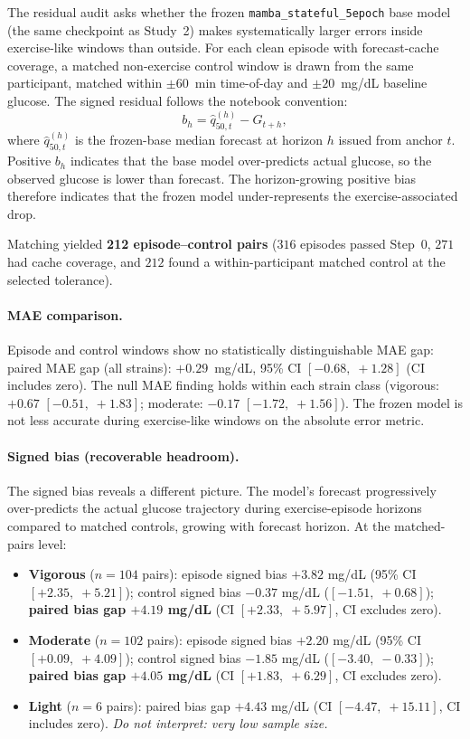 The residual audit asks whether the frozen \texttt{mamba\_stateful\_5epoch}
base model (the same checkpoint as Study~2) makes systematically larger errors
inside exercise-like windows than outside.
For each clean episode with forecast-cache coverage, a matched non-exercise
control window is drawn from the same participant, matched within
$\pm 60$~min time-of-day and $\pm 20$~mg/dL baseline glucose.
The signed residual follows the notebook convention:
\begin{equation}
  b_{h} = \hat{q}_{50,t}^{(h)} - G_{t+h},
  \label{eq:signed_residual}
\end{equation}
where $\hat{q}_{50,t}^{(h)}$ is the frozen-base median forecast at horizon $h$
issued from anchor $t$.
Positive $b_{h}$ indicates that the base model over-predicts actual glucose,
so the observed glucose is lower than forecast.  The horizon-growing positive
bias therefore indicates that the frozen model under-represents the
exercise-associated drop.

Matching yielded \textbf{212 episode--control pairs}
($316$ episodes passed Step~0, $271$ had cache coverage, and $212$ found a
within-participant matched control at the selected tolerance).

\paragraph{MAE comparison.}
Episode and control windows show no statistically distinguishable MAE gap:
paired MAE gap (all strains): $+0.29$~mg/dL, 95\% CI $[-0.68,\;+1.28]$
(CI includes zero).
The null MAE finding holds within each strain class
(vigorous: $+0.67$ $[-0.51,\;+1.83]$;
moderate: $-0.17$ $[-1.72,\;+1.56]$).
The frozen model is not less accurate during exercise-like windows on the
absolute error metric.

\paragraph{Signed bias (recoverable headroom).}
The signed bias reveals a different picture.
The model's forecast progressively over-predicts the actual glucose
trajectory during exercise-episode horizons compared to matched controls,
growing with forecast horizon.
At the matched-pairs level:

\begin{itemize}
  \item \textbf{Vigorous} ($n = 104$ pairs):
        episode signed bias $+3.82$ mg/dL (95\% CI $[+2.35,\;+5.21]$);
        control signed bias $-0.37$ mg/dL ($[-1.51,\;+0.68]$);
        \textbf{paired bias gap $+4.19$ mg/dL} (CI $[+2.33,\;+5.97]$,
        CI excludes zero).
  \item \textbf{Moderate} ($n = 102$ pairs):
        episode signed bias $+2.20$ mg/dL (95\% CI $[+0.09,\;+4.09]$);
        control signed bias $-1.85$ mg/dL ($[-3.40,\;-0.33]$);
        \textbf{paired bias gap $+4.05$ mg/dL} (CI $[+1.83,\;+6.29]$,
        CI excludes zero).
  \item \textbf{Light} ($n = 6$ pairs):
        paired bias gap $+4.43$ mg/dL (CI $[-4.47,\;+15.11]$,
        CI includes zero). \emph{Do not interpret: very low sample size.}
\end{itemize}

